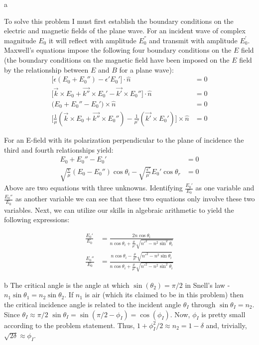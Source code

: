 \begin{homeworkProblem}
\begin{homeworkSection}{a}

To solve this problem I must first establish the boundary conditions on the electric and magnetic fields of the plane wave. For an incident wave of complex magnitude $E_0$ it will reflect with amplitude $E_0^{''}$ and transmit with amplitude $E_0^{'}$. Maxwell's equations impose the following four boundary conditions on the $E$ field (the boundary conditions on the magnetic field have been imposed on the $E$ field by the relationship between $E$ and $B$ for a plane wave):
\begin{align*}
   \big[ \epsilon (E_0 + E_0'')- \epsilon'E_0' \big]  \cdot \hat{n} &= 0 \\
   \big[\vec{k}\times E_0 +\vec{k''}\times E_0'-\vec{k'}\times E_0''\big]\cdot \hat{n} &= 0 \\
   \big(E_0 + E_0'' - E_0'\big)\times \hat{n} &= 0 \\ 
   \big[ \frac{1}{\mu}(\vec{k}\times E_0 + \vec{k''}\times E_0'') - \frac{1}{\mu'}(\vec{k'} \times E_0') \big] \times \hat{n} &= 0
\end{align*}

For an E-field with its polarization perpendicular to the plane of incidence the third and fourth relationships yield:
\begin{align*}
   E_0 + E_0''-E_0' &= 0 \\
   \sqrt{\frac{\epsilon}{\mu}}(E_0 - E_0'')\cos\theta_i - \sqrt{\frac{\epsilon'}{\mu'}}E_0'\cos\theta_r & = 0
\end{align*}
Above are two equations with three unknowns. Identifying $\frac{E_0'}{E_0}$ as one variable and $\frac{E_0''}{E_0}$ as another variable we can see that these two equations only involve these two variables. Next, we can utilize our skills in algebraic arithmetic to yield the following expressions:

\begin{align*}
  \frac{E_0'}{E_0} &= \frac{2 n \cos\theta_i}{n\cos\theta_i + \frac{\mu}{\mu'}\sqrt{n'^2-n^2\sin^2\theta_i}} \\
  \frac{E_0''}{E_0} &= \frac{n\cos\theta_i - \frac{\mu}{\mu'}\sqrt{n'^2-n^2\sin\theta_i}}{n\cos\theta_i+\frac{\mu}{\mu'}\sqrt{n'^2-n^2\sin^2\theta_i}}
\end{align*}

\end{homeworkSection}
\begin{homeworkSection}{b}
The critical angle is the angle at which $\sin(\theta_2)= \pi/2$ in Snell's law - $n_1 \sin\theta_1 = n_2\sin\theta_2$. If $n_1$ is air (which its claimed to be in this problem) then the critical incidence angle is related to the incident angle $\theta_I$ through $\sin\theta_I = n_2$. Since $\theta_I \approx \pi/2$ $\sin\theta_I = \sin(\pi/2-\phi_I) = \cos(\phi_I)$. Now, $\phi_I$ is pretty small according to the problem statement. Thus, $1+\phi_I^2/2 \approx n_2 = 1-\delta$ and, trivially, $\sqrt{2\delta}\approx \phi_I$.
\end{homeworkSection}


\end{homeworkProblem}
